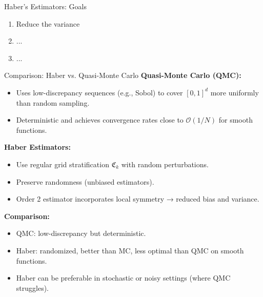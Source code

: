 \documentclass[aspectratio=169,xcolor=dvipsnames]{beamer}
\begin{document}
    \begin{frame}{Haber's Estimators: Goals}
        \begin{enumerate}
            \item Reduce the variance
            \item ...
            \item ...
        \end{enumerate}


    \end{frame}

    \begin{frame}{Comparison: Haber vs. Quasi-Monte Carlo}
        \textbf{Quasi-Monte Carlo (QMC):}
        \begin{itemize}
            \item Uses low-discrepancy sequences (e.g., Sobol) to cover \([0,1]^d\) more uniformly than random sampling.
            \item Deterministic and achieves convergence rates close to \( \mathcal{O}(1/N) \) for smooth functions.
        \end{itemize}
        
        \textbf{Haber Estimators:}
        \begin{itemize}
            \item Use regular grid stratification \( \mathfrak{C}_k \) with random perturbations.
            \item Preserve randomness (unbiased estimators).
            \item Order 2 estimator incorporates local symmetry → reduced bias and variance.
        \end{itemize}
        
        \vspace{1em}
        \textbf{Comparison:}
        \begin{itemize}
            \item QMC: low-discrepancy but deterministic.
            \item Haber: randomized, better than MC, less optimal than QMC on smooth functions.
            \item Haber can be preferable in stochastic or noisy settings (where QMC struggles).
        \end{itemize}
    \end{frame}

\end{document}
